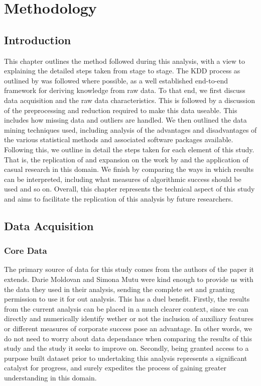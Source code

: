%
%
%
%

\chapter{Methodology}\label{C.Methodology}
\section{Introduction}
{This chapter outlines the method followed during this analysis, with a view to explaining the detailed steps taken from stage to stage. The KDD process as outlined by \cite{fayyad1996kdd} was followed where possible, as a well established end-to-end framework for deriving knowledge from raw data. To that end, we first discuss data acquisition and the raw data characteristics. This is followed by a discussion of the preprocessing and reduction required to make this data useable. This includes how missing data and outliers are handled. We then outlined the data mining techniques used, including analysis of the advantages and disadvantages of the various statistical methods and associated software packages available. Following this, we outline in detail the steps taken for each element of this study. That is, the replication of and expansion on the work by \cite{moldovan2015learning} and the application of casual research in this domain. We finish by comparing the ways in which results can be interpreted, including what measures of algorithmic success should be used and so on. Overall, this chapter represents the technical aspect of this study and aims to facilitate the replication of this analysis by future researchers. }
\section{Data Acquisition}
\subsection{Core Data}
{The primary source of data for this study comes from the authors of the paper it extends. Darie Moldovan and Simona Mutu were kind enough to provide us with the data they used in their analysis, sending the complete set and granting permission to use it for out analysis. This has a duel benefit. Firstly, the results from the current analysis can be placed in a much clearer context, since we can directly and numerically identify wether or not the inclusion of auxiliary features or different measures of corporate success pose an advantage. In other words, we do not need to worry about data dependance when comparing the results of this study and the study it seeks to improve on. Secondly, being granted access to a purpose built dataset prior to undertaking this analysis represents a significant catalyst for progress, and surely expedites the process of gaining greater understanding in this domain.}
